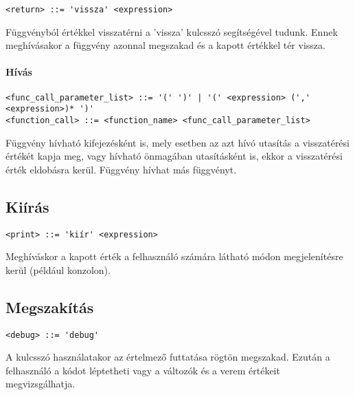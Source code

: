 \begin{footnotesize}
\begin{verbatim}
<return> ::= 'vissza' <expression>
\end{verbatim}
\end{footnotesize}

Függvényból értékkel visszatérni a 'vissza' kulcsszó segítségével tudunk. Ennek meghívásakor a függvény azonnal megszakad és a kapott értékkel tér vissza.

\paragraph{Hívás}

\begin{footnotesize}
\begin{verbatim}
<func_call_parameter_list> ::= '(' ')' | '(' <expression> (',' <expression>)* ')'
<function_call> ::= <function_name> <func_call_parameter_list>
\end{verbatim}
\end{footnotesize}

Függvény hívható kifejezésként is, mely esetben az azt hívó utasítás a visszatérési értékét kapja meg, vagy hívható önmagában utasításként is, ekkor a visszatérési érték eldobásra kerül. Függvény hívhat más függvényt.

\subsection{Kiírás}

\begin{footnotesize}
\begin{verbatim}
<print> ::= 'kiír' <expression>
\end{verbatim}
\end{footnotesize}

Meghíváskor a kapott érték a felhasználó számára látható módon megjelenítésre kerül (például konzolon).

\subsection{Megszakítás}

\begin{footnotesize}
\begin{verbatim}
<debug> ::= 'debug'
\end{verbatim}
\end{footnotesize}

A kulcsszó használatakor az értelmező futtatása rögtön megszakad. Ezután a felhasználó a kódot léptetheti vagy a változók és a verem értékeit megvizsgálhatja.

